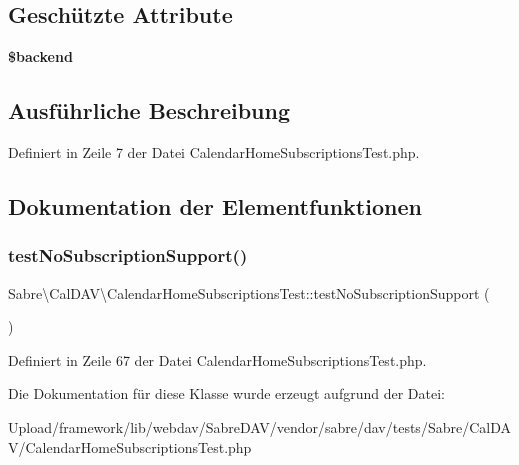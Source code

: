 \subsection*{Geschützte Attribute}
\begin{DoxyCompactItemize}
\item 
\mbox{\label{class_sabre_1_1_cal_d_a_v_1_1_calendar_home_subscriptions_test_a60bd20edb1d7b4e1a9cf3cb176f483b9}} 
{\bfseries \$backend}
\end{DoxyCompactItemize}


\subsection{Ausführliche Beschreibung}


Definiert in Zeile 7 der Datei Calendar\+Home\+Subscriptions\+Test.\+php.



\subsection{Dokumentation der Elementfunktionen}
\mbox{\label{class_sabre_1_1_cal_d_a_v_1_1_calendar_home_subscriptions_test_a4f237ebb1bf20982c9d9cdf139f3bfad}} 
\subsubsection{\texorpdfstring{test\+No\+Subscription\+Support()}{testNoSubscriptionSupport()}}
{\footnotesize\ttfamily Sabre\textbackslash{}\+Cal\+D\+A\+V\textbackslash{}\+Calendar\+Home\+Subscriptions\+Test\+::test\+No\+Subscription\+Support (\begin{DoxyParamCaption}{ }\end{DoxyParamCaption})}



Definiert in Zeile 67 der Datei Calendar\+Home\+Subscriptions\+Test.\+php.



Die Dokumentation für diese Klasse wurde erzeugt aufgrund der Datei\+:\begin{DoxyCompactItemize}
\item 
Upload/framework/lib/webdav/\+Sabre\+D\+A\+V/vendor/sabre/dav/tests/\+Sabre/\+Cal\+D\+A\+V/Calendar\+Home\+Subscriptions\+Test.\+php\end{DoxyCompactItemize}
